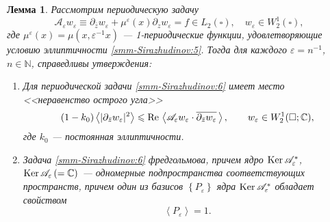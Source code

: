\documentclass[a4paper,12pt]{article}
\newtheorem{lemma}[theorem]{Лемма}
\theoremstyle{definition}
\begin{document}
	\begin{lemma}
		Рассмотрим периодическую задачу
		\begin{equation}\label{smm-Sirazhudinov:6}
			\mathscr{A}_\varepsilon w_\varepsilon\equiv
			\partial_{\bar z}w_\varepsilon+\mu^\varepsilon(x)\partial_zw_\varepsilon
			=f\in L_2(\square),\quad w_\varepsilon\in W_2^1(\square),
		\end{equation}
		где $\mu^\varepsilon(x)=\mu(x,\varepsilon^{-1}x)$ 	--- {\rm 1}-периодические функции, удовлетворяющие условию эллиптичности \eqref{smm-Sirazhudinov:5}.
		Тогда для каждого $\varepsilon=n^{-1}$, $n\in \mathbb N$, справедливы утверждения:
		\begin{enumerate}
			\item[1)] Для периодической задачи \eqref{smm-Sirazhudinov:6} имеет место <<неравенство острого угла>>
			\begin{equation}\label{smm-Sirazhudinov:7}
				(1-k_0)\left<|\partial_{\bar{z}}w_\varepsilon|^2\right>\leqslant \text{\rm Re\,}\left<\mathscr{A}_\varepsilon w_\varepsilon\cdot \overline{\partial_{\bar{z}}w_\varepsilon}\,\right>,\qquad  w_\varepsilon\in W_2^1(\square;\mathbb{C}),
			\end{equation}
			где $k_0$ --- постоянная эллиптичности.
			\item[2)] Задача \eqref{smm-Sirazhudinov:6} фредгольмова, причем ядро  $\text{\rm Ker\,}\mathscr{A}_\varepsilon^\ast$, $\text{\rm Ker\,}\mathscr{A}_\varepsilon\,(=\mathbb{C})$
			--- одномерные подпространства соответствующих пространств,
			причем один из базисов $\left\{P_\varepsilon\right\}$ ядра
			$\text{\rm Ker\,}\mathscr{A}_\varepsilon^\ast$ обладает свойством
			\begin{equation*}%
				\left<P_\varepsilon\right>=1.
			\end{equation*}
			\end{enumerate}
	\end{lemma}
\end{document}
